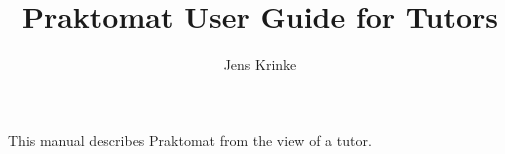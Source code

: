 \documentclass{article}
\begin{document}
\title{Praktomat User Guide for Tutors}
\author{Jens Krinke}
\maketitle

This manual describes Praktomat from the view of a tutor.

\tableofcontents


\end{document}
